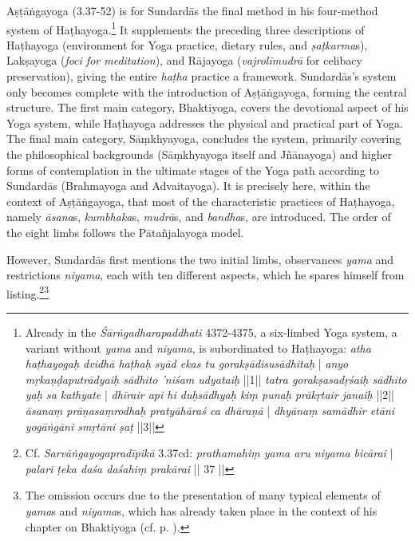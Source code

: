 Aṣṭāṅgayoga (3.37-52) is for Sundardās the final method in his four-method system of Haṭhayoga.\footnote{Already in the \emph{Śārṅgadharapaddhati} 4372-4375, a six-limbed Yoga system, a variant without \textit{yama} and \textit{niyama}, is subordinated to Haṭhayoga: \textit{atha haṭhayogaḥ dvidhā haṭhaḥ syād ekas tu gorakṣādisusādhitaḥ} | \textit{anyo mṛkaṇḍaputrādyaiḥ sādhito 'niśam udyataiḥ} ||1|| \textit{tatra gorakṣasadṛśaiḥ sādhito yaḥ sa kathyate} | \textit{dhīrair api hi duḥsādhyaḥ kiṃ punaḥ prākṛtair janaiḥ} ||2|| \textit{āsanaṃ prāṇasaṃrodhaḥ pratyāhāraś ca dhāraṇā} | \textit{dhyānaṃ samādhir etāni yogāṅgāni smṛtāni ṣaṭ} ||3||} It supplements the preceding three descriptions of Haṭhayoga (environment for Yoga practice, dietary rules, and \textit{ṣaṭkarma}s), Lakṣayoga (\textit{foci for meditation}), and Rājayoga (\textit{vajrolīmudrā} for celibacy preservation), giving the entire \textit{haṭha} practice a framework. Sundardās's system only becomes complete with the introduction of Aṣṭāṅgayoga, forming the central structure. The first main category, Bhaktiyoga, covers the devotional aspect of his Yoga system, while Haṭhayoga addresses the physical and practical part of Yoga. The final main category, Sāṃkhyayoga, concludes the system, primarily covering the philosophical backgrounds (Sāṃkhyayoga itself and Jñānayoga) and higher forms of contemplation in the ultimate stages of the Yoga path according to Sundardās (Brahmayoga and Advaitayoga). It is precisely here, within the context of Aṣṭāṅgayoga, that most of the characteristic practices of Haṭhayoga, namely \textit{āsana}s, \textit{kumbhaka}s, \textit{mudrā}s, and \textit{bandha}s, are introduced. The order of the eight limbs follows the Pātañjalayoga model.

However, Sundardās first mentions the two initial limbs, observances \textit{yama} and restrictions \textit{niyama}, each with ten different aspects, which he spares himself from listing.\footnote{Cf. \textit{Sarvāṅgayogapradīpikā} 3.37cd: \textit{prathamahiṃ yama aru niyama bicārai} | \textit{palari ṭeka daśa daśahiṃ prakārai} || 37 ||}\footnote{The omission occurs due to the presentation of many typical elements of \textit{yama}s and \textit{niyama}s, which has already taken place in the context of his chapter on Bhaktiyoga (cf. p. \pageref{sarvangabhakti}).}


